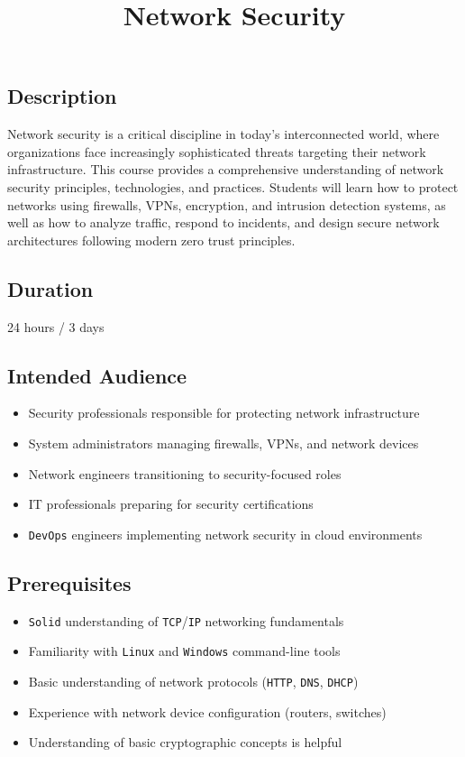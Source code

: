 \documentclass[
]{article}
\title{Network Security}
\author{}
\date{}
\providecommand{\tightlist}{%
  \setlength{\itemsep}{0pt}\setlength{\parskip}{0pt}}
\begin{document}
\maketitle

\subsection{Description}\label{description}

Network security is a critical discipline in today's interconnected
world, where organizations face increasingly sophisticated threats
targeting their network infrastructure. This course provides a
comprehensive understanding of network security principles,
technologies, and practices. Students will learn how to protect networks
using firewalls, VPNs, encryption, and intrusion detection systems, as
well as how to analyze traffic, respond to incidents, and design secure
network architectures following modern zero trust principles.

\subsection{Duration}\label{duration}

24 hours / 3 days

\subsection{Intended Audience}\label{intended-audience}

\begin{itemize}
\tightlist
\item
  Security professionals responsible for protecting network
  infrastructure
\item
  System administrators managing firewalls, VPNs, and network devices
\item
  Network engineers transitioning to security-focused roles
\item
  IT professionals preparing for security certifications
\item
  \texttt{DevOps} engineers implementing network security in cloud
  environments
\end{itemize}

\subsection{Prerequisites}\label{prerequisites}

\begin{itemize}
\tightlist
\item
  \texttt{Solid} understanding of \texttt{TCP}/\texttt{IP} networking
  fundamentals
\item
  Familiarity with \texttt{Linux} and \texttt{Windows} command-line
  tools
\item
  Basic understanding of network protocols (\texttt{HTTP}, \texttt{DNS},
  \texttt{DHCP})
\item
  Experience with network device configuration (routers, switches)
\item
  Understanding of basic cryptographic concepts is helpful
\end{itemize}
\end{document}
